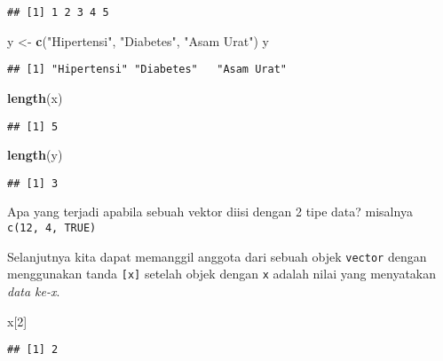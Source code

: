 \documentclass[
]{book}
\newenvironment{Shaded}{\begin{snugshade}}{\end{snugshade}}
\newcommand{\DecValTok}[1]{\textcolor[rgb]{0.00,0.00,0.81}{#1}}
\newcommand{\KeywordTok}[1]{\textcolor[rgb]{0.13,0.29,0.53}{\textbf{#1}}}
\newcommand{\NormalTok}[1]{#1}
\newcommand{\StringTok}[1]{\textcolor[rgb]{0.31,0.60,0.02}{#1}}
\begin{document}
\begin{verbatim}
## [1] 1 2 3 4 5
\end{verbatim}

\begin{Shaded}
\begin{Highlighting}[]
\NormalTok{y <-}\StringTok{ }\KeywordTok{c}\NormalTok{(}\StringTok{"Hipertensi"}\NormalTok{, }\StringTok{"Diabetes"}\NormalTok{, }\StringTok{"Asam Urat"}\NormalTok{)}
\NormalTok{y}
\end{Highlighting}
\end{Shaded}

\begin{verbatim}
## [1] "Hipertensi" "Diabetes"   "Asam Urat"
\end{verbatim}

\begin{Shaded}
\begin{Highlighting}[]
\KeywordTok{length}\NormalTok{(x)}
\end{Highlighting}
\end{Shaded}

\begin{verbatim}
## [1] 5
\end{verbatim}

\begin{Shaded}
\begin{Highlighting}[]
\KeywordTok{length}\NormalTok{(y)}
\end{Highlighting}
\end{Shaded}

\begin{verbatim}
## [1] 3
\end{verbatim}

Apa yang terjadi apabila sebuah vektor diisi dengan 2 tipe data? misalnya \texttt{c(12,\ 4,\ TRUE)}

Selanjutnya kita dapat memanggil anggota dari sebuah objek \texttt{vector} dengan menggunakan tanda \texttt{{[}x{]}} setelah objek dengan \texttt{x} adalah nilai yang menyatakan \emph{data ke-x}.

\begin{Shaded}
\begin{Highlighting}[]
\NormalTok{x[}\DecValTok{2}\NormalTok{]}
\end{Highlighting}
\end{Shaded}

\begin{verbatim}
## [1] 2
\end{verbatim}
\end{document}

